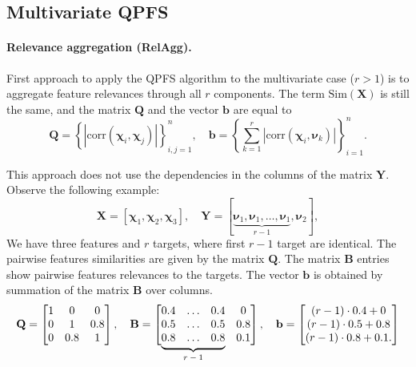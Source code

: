 \documentclass[12pt,twoside]{article}
\theoremstyle{definition}
\newcommand{\bb}{\mathbf{b}}
\newcommand{\bY}{\mathbf{Y}}
\newcommand{\bX}{\mathbf{X}}
\newcommand{\bB}{\mathbf{B}}
\newcommand{\bQ}{\mathbf{Q}}
\newcommand{\bchi}{\boldsymbol{\chi}}
\newcommand{\bnu}{\boldsymbol{\nu}}
\newcommand\undermat[2]{%
	\makebox[0pt][l]{$\smash{\underbrace{\phantom{%
					\begin{matrix}#2\end{matrix}}}_{\text{$#1$}}}$}#2}
\begin{document}
\subsection{Multivariate QPFS}

\paragraph{Relevance aggregation (RelAgg).}

First approach to apply the QPFS algorithm to the multivariate case ($r > 1$) is to aggregate feature relevances through all $r$ components. The term $\text{Sim}(\bX)$ is still the same, and the matrix $\bQ$ and the vector $\bb$ are equal to
\begin{equation*}
\bQ = \left\{\left|\text{corr}(\bchi_i, \bchi_j)\right|\right\}_{i,j=1}^n, \quad \bb = \left\{\sum_{k=1}^r\left|\text{corr}(\bchi_i, \bnu_k)\right|\right\}_{i=1}^n.
\end{equation*}

This approach does not use the dependencies in the columns of the matrix $\bY$. Observe the following example:
\[
	\bX = [\bchi_1, \bchi_2, \bchi_3], \quad \bY = [\underbrace{\bnu_1, \bnu_1, \dots, \bnu_1}_{r-1}, \bnu_2],
\]
We have three features and $r$ targets, where first $r-1$ target are identical.
The pairwise features similarities are given by the matrix $\bQ$.
The matrix $\bB$ entries show pairwise features relevances to the targets.
The vector $\bb$ is obtained by summation of the matrix $\bB$ over columns.
\begin{equation}
	\bQ = \begin{bmatrix} 1 & 0 & 0\\ 0 & 1 & 0.8 \\ 0 & 0.8 & 1 \end{bmatrix}, \quad
	\bB = \begin{bmatrix} 0.4 & \dots & 0.4 & 0 \\ 0.5 & \dots & 0.5 & 0.8 \\ \undermat{r-1}{0.8 & \dots & 0.8} & 0.1 \end{bmatrix}, \quad
	\bb = \begin{bmatrix} (r-1) \cdot 0.4 + 0 \\ (r-1) \cdot 0.5 + 0.8 \\ (r-1) \cdot 0.8 + 0.1. \end{bmatrix}
	\label{eq:qpfs_example}
\end{equation}
	\vspace{0.5cm}
\end{document}
